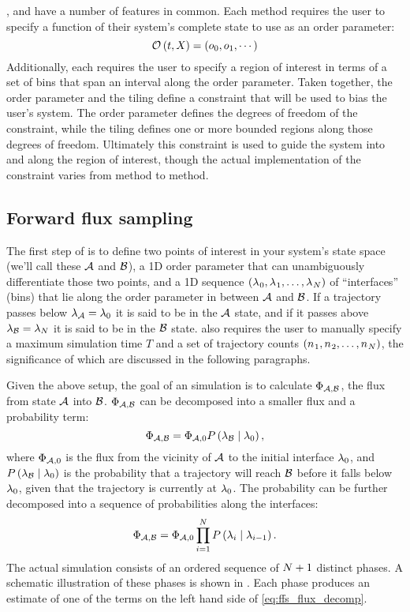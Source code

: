 ,  and  have a number of features in common. Each method requires the user to specify a function of their system's complete state to use as an order parameter:
\begin{equation*}
    \mathcal{O}_{} \left( t, X_{} \right) = \left( o_{0}, o_{1}, \cdots \right)
\end{equation*}
Additionally, each requires the user to specify a region of interest in terms of a set of bins that span an interval along the order parameter. Taken together, the order parameter and the tiling define a constraint that will be used to bias the user's system. The order parameter defines the degrees of freedom of the constraint, while the tiling defines one or more bounded regions along those degrees of freedom. Ultimately this constraint is used to guide the system into and along the region of interest, though the actual implementation of the constraint varies from method to method.

\subsection{Forward flux sampling}

The first step of  is to define two points of interest in your system's state space (we'll call these $\mathcal{A}$ and $\mathcal{B}$), a 1D order parameter that can unambiguously differentiate those two points, and a 1D sequence $\left( {{\lambda}_{}}_{0}, {{\lambda}_{}}_{1}, \dots, {{\lambda}_{}}_{N} \right)$ of ``interfaces'' (\ie bins) that lie along the order parameter in between $\mathcal{A}$ and $\mathcal{B}$. If a trajectory passes below ${\lambda}_{\mathcal{A}} = {\lambda}_{0}$ it is said to be in the $\mathcal{A}$ state, and if it passes above ${\lambda}_{\mathcal{B}} = {\lambda}_{N}$ it is said to be in the $\mathcal{B}$ state.  also requires the user to manually specify a maximum simulation time $T$ and a set of trajectory counts $\left( {n_{}}_{1}, {n_{}}_{2}, \dots, {n_{}}_{N} \right)$, the significance of which are discussed in the following paragraphs.

Given the above setup, the goal of an  simulation is to calculate $\Phi_{\mathcal{A}, \mathcal{B}}$, the flux from state $\mathcal{A}$ into $\mathcal{B}$. $\Phi_{\mathcal{A}, \mathcal{B}}$ can be decomposed into a smaller flux and a probability term:
\begin{equation*}
    \Phi_{\mathcal{A}, \mathcal{B}} = \Phi_{\mathcal{A}, 0} P\left(  {\lambda}_{\mathcal{B}} \mid {\lambda}_{0}  \right),
\end{equation*}
where $\Phi_{\mathcal{A}, 0}$ is the flux from the vicinity of $\mathcal{A}$ to the initial interface ${\lambda}_{0}$, and $P\left(  {\lambda}_{\mathcal{B}} \mid {\lambda}_{0}  \right)$ is the probability that a trajectory will reach $\mathcal{B}$ before it falls below ${\lambda}_{0}$, given that the trajectory is currently at ${\lambda}_{0}$. The probability can be further decomposed into a sequence of probabilities along the interfaces:
\begin{equation}\label{eq:ffs_flux_decomp}
    \Phi_{\mathcal{A}, \mathcal{B}} = \Phi_{\mathcal{A}, 0} \prod_{i=1}^{N} P\left(  {\lambda}_{i} \mid {\lambda}_{i - 1}  \right).
\end{equation}
The actual  simulation consists of an ordered sequence of $N + 1$ distinct phases. A schematic illustration of these phases is shown in . Each phase produces an estimate of one of the terms on the left hand side of \eqref{eq:ffs_flux_decomp}. 

